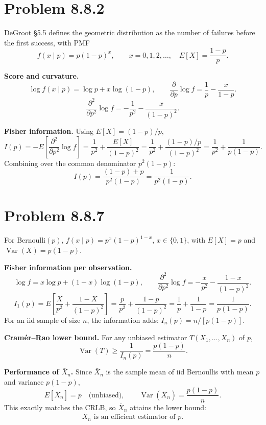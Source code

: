 \documentclass[11pt]{article}
\begin{document}
\section*{Problem 8.8.2}

DeGroot \S5.5 defines the geometric distribution as the number of failures before the first success, with PMF
\[
f(x \mid p) = p(1-p)^x, \qquad x = 0, 1, 2, \dots,
\quad E[X] = \frac{1-p}{p}.
\]

\textbf{Score and curvature.}
\[
\log f(x\mid p) = \log p + x \log(1-p),
\qquad
\frac{\partial}{\partial p}\log f = \frac{1}{p} - \frac{x}{1-p}.
\]
\[
\frac{\partial^2}{\partial p^2} \log f = -\frac{1}{p^2} - \frac{x}{(1-p)^2}.
\]

\textbf{Fisher information.} Using $E[X] = (1-p)/p$,
\[
I(p) = -E\!\left[\frac{\partial^2}{\partial p^2}\log f\right]
= \frac{1}{p^2} + \frac{E[X]}{(1-p)^2}
= \frac{1}{p^2} + \frac{(1-p)/p}{(1-p)^2}
= \frac{1}{p^2} + \frac{1}{p(1-p)}.
\]
Combining over the common denominator $p^2(1-p)$:
\[
I(p) = \frac{(1-p) + p}{p^2(1-p)} = \boxed{\frac{1}{p^2(1-p)}.}
\]

\section*{Problem 8.8.7}

For Bernoulli$(p)$, $f(x \mid p) = p^x(1-p)^{1-x}$, $x\in\{0,1\}$, with $E[X] = p$ and $\operatorname{Var}(X) = p(1-p)$.

\textbf{Fisher information per observation.}
\[
\log f = x\log p + (1-x)\log(1-p),
\qquad
\frac{\partial^2}{\partial p^2}\log f = -\frac{x}{p^2} - \frac{1-x}{(1-p)^2}.
\]
\[
I_1(p) = E\!\left[\frac{X}{p^2} + \frac{1-X}{(1-p)^2}\right]
= \frac{p}{p^2} + \frac{1-p}{(1-p)^2}
= \frac{1}{p} + \frac{1}{1-p}
= \frac{1}{p(1-p)}.
\]
For an iid sample of size $n$, the information adds: $I_n(p) = n/[p(1-p)]$.

\textbf{Cram\'er--Rao lower bound.} For any unbiased estimator $T(X_1,\dots,X_n)$ of $p$,
\[
\operatorname{Var}(T) \ge \frac{1}{I_n(p)} = \frac{p(1-p)}{n}.
\]

\textbf{Performance of $\bar{X}_n$.} Since $\bar{X}_n$ is the sample mean of iid Bernoullis with mean $p$ and variance $p(1-p)$,
\[
E[\bar{X}_n] = p \quad \text{(unbiased)},
\qquad
\operatorname{Var}(\bar{X}_n) = \frac{p(1-p)}{n}.
\]
This exactly matches the CRLB, so $\bar{X}_n$ attains the lower bound:
\[
\boxed{\bar{X}_n \text{ is an efficient estimator of } p.}
\]
\end{document}
